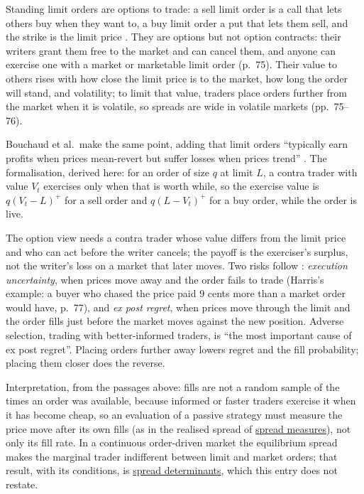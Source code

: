 \begin{qfresult}\label{res:limit-order-options}
 Standing limit orders are options to trade: a sell limit order is a call that lets others buy when they want to, a buy limit order a put that lets them sell, and the strike is the limit price \citep[chap.~4, sec.~4.4.2, p.~75]{alpha-harris}. They are options but not option contracts: their writers grant them free to the market and can cancel them, and anyone can exercise one with a market or marketable limit order (p.~75). Their value to others rises with how close the limit price is to the market, how long the order will stand, and volatility; to limit that value, traders place orders further from the market when it is volatile, so spreads are wide in volatile markets (pp.~75--76).

Bouchaud et al.\ make the same point, adding that limit orders ``typically earn profits when prices mean-revert but suffer losses when prices trend'' \citep[chap.~3, sec.~3.1.3, p.~46]{catalogue-0528}. The formalisation, derived here: for an order of size $q$ at limit $L$, a contra trader with value $V_t$ exercises only when that is worth while, so the exercise value is $q(V_t-L)^+$ for a sell order and $q(L-V_t)^+$ for a buy order, while the order is live.

 The option view needs a contra trader whose value differs from the limit price and who can act before the writer cancels; the payoff is the exerciser's surplus, not the writer's loss on a market that later moves. Two risks follow \citep[chap.~4, sec.~4.4.4, p.~77]{alpha-harris}: \emph{execution uncertainty}, when prices move away and the order fails to trade (Harris's example: a buyer who chased the price paid 9 cents more than a market order would have, p.~77), and \emph{ex post regret}, when prices move through the limit and the order fills just before the market moves against the new position. Adverse selection, trading with better-informed traders, is ``the most important cause of ex post regret''. Placing orders further away lowers regret and the fill probability; placing them closer does the reverse.

 Interpretation, from the passages above: fills are not a random sample of the times an order was available, because informed or faster traders exercise it when it has become cheap, so an evaluation of a passive strategy must measure the price move after its own fills (as in the realised spread of \hyperref[def:spread-measures]{spread measures}), not only its fill rate. In a continuous order-driven market the equilibrium spread makes the marginal trader indifferent between limit and market orders; that result, with its conditions, is \hyperref[res:spread-determinants]{spread determinants}, which this entry does not restate.


\end{qfresult}
